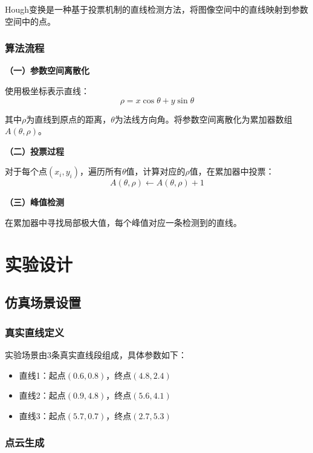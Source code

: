 \documentclass[12pt,a4paper]{article}
\begin{document}
Hough变换是一种基于投票机制的直线检测方法，将图像空间中的直线映射到参数空间中的点。

\subsubsection{算法流程}

\textbf{（一）参数空间离散化}

使用极坐标表示直线：
\begin{equation}
    \rho = x\cos\theta + y\sin\theta
\end{equation}

其中$\rho$为直线到原点的距离，$\theta$为法线方向角。将参数空间离散化为累加器数组$A(\theta, \rho)$。

\textbf{（二）投票过程}

对于每个点$(x_i, y_i)$，遍历所有$\theta$值，计算对应的$\rho$值，在累加器中投票：
\begin{equation}
    A(\theta, \rho) \leftarrow A(\theta, \rho) + 1
\end{equation}

\textbf{（三）峰值检测}

在累加器中寻找局部极大值，每个峰值对应一条检测到的直线。

\section{实验设计}

\subsection{仿真场景设置}

\subsubsection{真实直线定义}

实验场景由3条真实直线段组成，具体参数如下：
\begin{itemize}[itemsep=0pt]
    \item 直线1：起点$(0.6, 0.8)$，终点$(4.8, 2.4)$
    \item 直线2：起点$(0.9, 4.8)$，终点$(5.6, 4.1)$
    \item 直线3：起点$(5.7, 0.7)$，终点$(2.7, 5.3)$
\end{itemize}

\subsubsection{点云生成}
\end{document}
